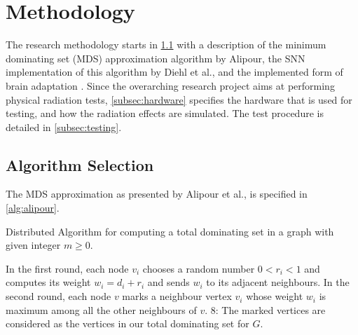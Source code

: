 \section{Methodology}\label{sec:methodology}
The research methodology starts in \cref{subsec:algorithm} with a description of the minimum dominating set (MDS) approximation algorithm by Alipour, the SNN implementation of this algorithm by Diehl et al., and the implemented form %
of brain adaptation \cite{alipour}\cite{diehl}. Since the overarching research project aims at performing physical radiation tests, \cref{subsec:hardware} specifies the hardware that is used for testing, and how the radiation effects are simulated. The test procedure is detailed in \cref{subsec:testing}.

\subsection{Algorithm Selection}\label{subsec:algorithm}
The MDS approximation as presented by Alipour et al., is specified in \cref{alg:alipour}.
\begin{algorithm}[h]%
    \caption{Distributed Algorithm for computing a total dominating set in a graph with given integer $m\geq 0$.}\label{alg:alipour}
    In the first round, each node $v_i$ chooses a random number $0<r_i<1$ and computes its weight $w_i=d_i+r_i$ and sends $w_i$ to its
    adjacent neighbours.\;
    In the second round, each node $v$ marks a neighbour vertex $v_i$ whose weight $w_i$ is maximum among all the other neighbours of $v$.\;
    8: The marked vertices are considered as the vertices in our total dominating set for $G$.\;
\end{algorithm}


